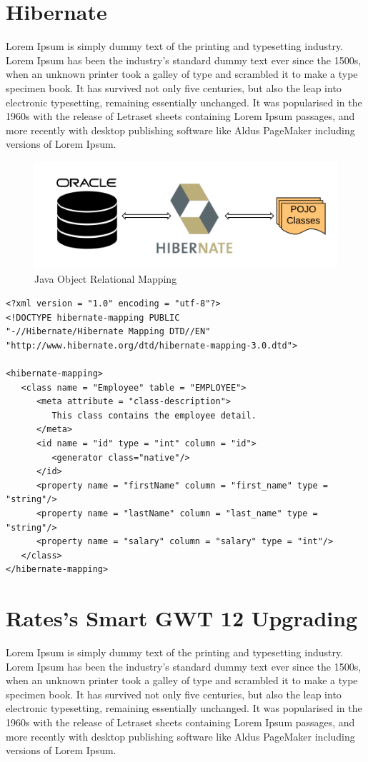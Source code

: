 \documentclass[12pt,a4paper]{report}
\begin{document}
\section{Hibernate}
Lorem Ipsum is simply dummy text of the printing and typesetting industry. Lorem Ipsum has been the industry's standard dummy text ever since the 1500s, when an unknown printer took a galley of type and scrambled it to make a type specimen book. It has survived not only five centuries, but also the leap into electronic typesetting, remaining essentially unchanged. It was popularised in the 1960s with the release of Letraset sheets containing Lorem Ipsum passages, and more recently with desktop publishing software like Aldus PageMaker including versions of Lorem Ipsum.

\begin{figure}[H]
\centering
\includegraphics[scale=1]{Hibernate.png}
  \caption{Java Object Relational Mapping}
  \label{fig:ORM}
\end{figure}
\begin{lstlisting}
<?xml version = "1.0" encoding = "utf-8"?>
<!DOCTYPE hibernate-mapping PUBLIC 
"-//Hibernate/Hibernate Mapping DTD//EN"
"http://www.hibernate.org/dtd/hibernate-mapping-3.0.dtd"> 

<hibernate-mapping>
   <class name = "Employee" table = "EMPLOYEE">
      <meta attribute = "class-description">
         This class contains the employee detail. 
      </meta>
      <id name = "id" type = "int" column = "id">
         <generator class="native"/>
      </id>
      <property name = "firstName" column = "first_name" type = "string"/>
      <property name = "lastName" column = "last_name" type = "string"/>
      <property name = "salary" column = "salary" type = "int"/>
   </class>
</hibernate-mapping>
\end{lstlisting}

\section{Rates's Smart GWT 12 Upgrading}
Lorem Ipsum is simply dummy text of the printing and typesetting industry. Lorem Ipsum has been the industry's standard dummy text ever since the 1500s, when an unknown printer took a galley of type and scrambled it to make a type specimen book. It has survived not only five centuries, but also the leap into electronic typesetting, remaining essentially unchanged. It was popularised in the 1960s with the release of Letraset sheets containing Lorem Ipsum passages, and more recently with desktop publishing software like Aldus PageMaker including versions of Lorem Ipsum.
\end{document}
